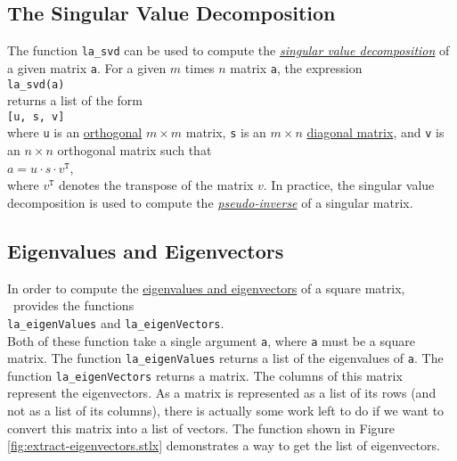 \subsection{The Singular Value Decomposition}
The function \texttt{la\_svd} can be used to compute the 
\href{http://en.wikipedia.org/wiki/Singular_value_decomposition}{\emph{singular value decomposition}} 
of a given matrix \texttt{a}.  For a given $m$ times $n$ matrix \texttt{a}, the expression 
\\[0.2cm]
\hspace*{1.3cm}
\texttt{la\_svd(a)}
\\[0.2cm]
returns a list of the form
\\[0.2cm]
\hspace*{1.3cm}
\texttt{[u, s, v]}
\\[0.2cm]
where \texttt{u} is an 
\href{http://en.wikipedia.org/wiki/Orthogonal_matrix}{orthogonal} $m \times m$ matrix, \texttt{s}
is an $m \times n$ 
\href{http://en.wikipedia.org/wiki/Diagonal_matrix}{diagonal matrix}, and \texttt{v} is an $n \times n$
orthogonal matrix such that
\\[0.2cm]
\hspace*{1.3cm}
$a = u \cdot s \cdot v^{\mathtt{T}}$,
\\[0.2cm]
where $v^{\mathtt{T}}$ denotes the transpose of the matrix $v$.
  In practice, the singular value decomposition is used to compute the
\href{http://en.wikipedia.org/wiki/Moore-Penrose_pseudoinverse}{\emph{pseudo-inverse}}
 of a singular matrix. 

\subsection{Eigenvalues and Eigenvectors}
In order to compute the 
\href{http://en.wikipedia.org/wiki/Eigenvalues_and_eigenvectors}{eigenvalues and eigenvectors} of a
square matrix, \setlx\ provides the functions
\\[0.2cm]
\hspace*{1.3cm}
\texttt{la\_eigenValues} \quad and \quad \texttt{la\_eigenVectors}.
\\[0.2cm]
Both of these function take a single argument \texttt{a}, where \texttt{a} must be a square matrix.
The function \texttt{la\_eigenValues} returns a list of the eigenvalues of \texttt{a}.  The
function \texttt{la\_eigenVectors} returns a matrix.  The columns of this matrix represent the
eigenvectors.  As a matrix is represented as a list of its rows (and not as a list of its columns),
there is actually some work left to do if we want to convert this matrix into a list of vectors.
The function shown in Figure \ref{fig:extract-eigenvectors.stlx} demonstrates a way to get the list of
eigenvectors. 

